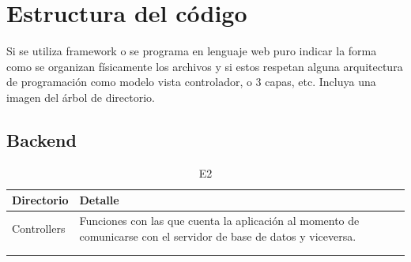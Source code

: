 \section{Estructura del código}

Si se utiliza framework o se programa en lenguaje web puro indicar la forma como se organizan físicamente los archivos y si estos respetan alguna arquitectura de programación como modelo vista controlador, o 3 capas, etc. Incluya una imagen del árbol de directorio.

\subsection{Backend}

 \begin{table}[H]
    \begin{center}
        \begin{tabular}{ | m{2cm} | m{8cm} | }
            \hline \textbf{Directorio} & \textbf{Detalle }\\ \hline
            Controllers & Funciones con las que cuenta la aplicación al momento de comunicarse con el servidor de base de datos y viceversa.   \\ \hline
                &    \\ \hline    
                &    \\ \hline   
              \end{tabular}
        \caption{E2}
    \end{center}
\end{table}


